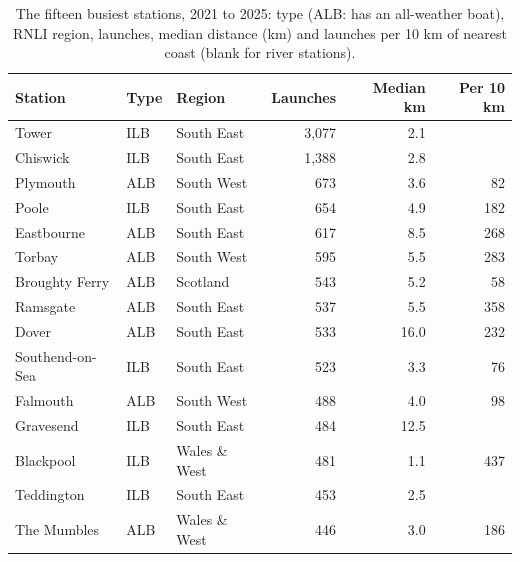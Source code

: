\documentclass[11pt,a4paper]{article}
\begin{document}
\begin{table}[tbp]\centering\small\caption{The fifteen busiest stations, 2021 to 2025: type (ALB: has an all-weather boat), RNLI region, launches, median distance (km) and launches per 10 km of nearest coast (blank for river stations).}\label{tab:stations}\begin{tabular}{lllrrr}\toprule Station & Type & Region & Launches & Median km & Per 10 km\\\midrule
Tower & ILB & South East & 3,077 & 2.1 & \\
Chiswick & ILB & South East & 1,388 & 2.8 & \\
Plymouth & ALB & South West & 673 & 3.6 & 82\\
Poole & ILB & South East & 654 & 4.9 & 182\\
Eastbourne & ALB & South East & 617 & 8.5 & 268\\
Torbay & ALB & South West & 595 & 5.5 & 283\\
Broughty Ferry & ALB & Scotland & 543 & 5.2 & 58\\
Ramsgate & ALB & South East & 537 & 5.5 & 358\\
Dover & ALB & South East & 533 & 16.0 & 232\\
Southend-on-Sea & ILB & South East & 523 & 3.3 & 76\\
Falmouth & ALB & South West & 488 & 4.0 & 98\\
Gravesend & ILB & South East & 484 & 12.5 & \\
Blackpool & ILB & Wales \& West & 481 & 1.1 & 437\\
Teddington & ILB & South East & 453 & 2.5 & \\
The Mumbles & ALB & Wales \& West & 446 & 3.0 & 186\\
\bottomrule\end{tabular}\end{table}
\end{document}
